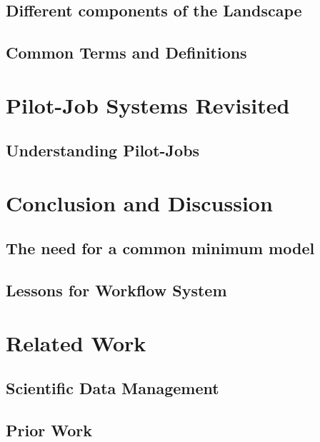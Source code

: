 \documentclass{sig-alternate}
\begin{document}
\subsection{Different components of the Landscape}


\subsection{Common Terms and Definitions}

\section{Pilot-Job Systems Revisited}

\subsection{Understanding Pilot-Jobs}


\section{Conclusion and Discussion}

\subsection{The need for a common minimum model}

\subsection{Lessons for Workflow System}

\section{Related Work}

\subsection{Scientific Data Management}

\subsection{Prior Work}
\end{document}
